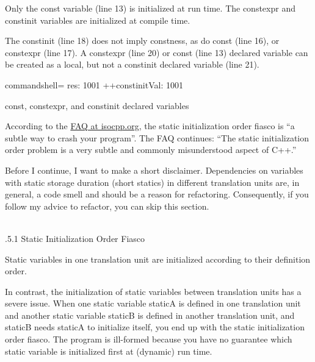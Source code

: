 Only the const variable (line 13) is initialized at run time. The constexpr and constinit variables are initialized at compile time.

The constinit (line 18) does not imply constness, as do const (line 16), or constexpr (line 17). A constexpr (line 20) or const (line 13) declared variable can be created as a local, but not a constinit declared variable (line 21).

\begin{tcblisting}{commandshell={}}
res: 1001
++constinitVal: 1001
\end{tcblisting}

\begin{center}
const, constexpr, and constinit declared variables
\end{center}


According to the \href{https://isocpp.org/wiki/faq/ctors#static-init-order}{FAQ at isocpp.org}, the static initialization order fiasco is “a subtle way to crash your program”. The FAQ continues: “The static initialization order problem is a very subtle and commonly misunderstood aspect of C++.”

Before I continue, I want to make a short disclaimer. Dependencies on variables with static storage duration (short statics) in different translation units are, in general, a code smell and should be a reason for refactoring. Consequently, if you follow my advice to refactor, you can skip this section.

\hspace*{\fill} \\ %
.5.1\hspace{0.2cm} Static Initialization Order Fiasco

Static variables in one translation unit are initialized according to their definition order.

In contrast, the initialization of static variables between translation units has a severe issue. When one static variable staticA is defined in one translation unit and another static variable staticB is defined in another translation unit, and staticB needs staticA to initialize itself, you end up with the static initialization order fiasco. The program is ill-formed because you have no guarantee which static variable is initialized first at (dynamic) run time.

